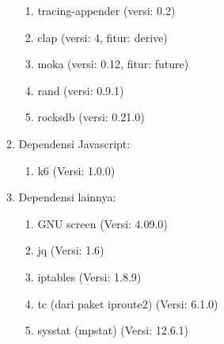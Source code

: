 \begin{enumerate}
\begin{enumerate}
\begin{enumerate}
			            \item tracing-appender (versi: 0.2)
			            \item clap (versi: 4, fitur: derive)
			            \item moka (versi: 0.12, fitur: future)
			            \item rand (versi: 0.9.1)
			            \item rocksdb (versi: 0.21.0)
		            \end{enumerate}
		      \item Dependensi Javascript:
		            \begin{enumerate}
			            \item k6 (Versi: 1.0.0)
		            \end{enumerate}
		      \item Dependensi lainnya:
		            \begin{enumerate}
			            \item GNU screen (Versi: 4.09.0)
			            \item jq (Versi: 1.6)
			            \item iptables (Versi: 1.8.9)
			            \item tc (dari paket iproute2) (Versi: 6.1.0)
			            \item sysstat (mpstat) (Versi: 12.6.1)
		            \end{enumerate}
	      \end{enumerate}
\end{enumerate}